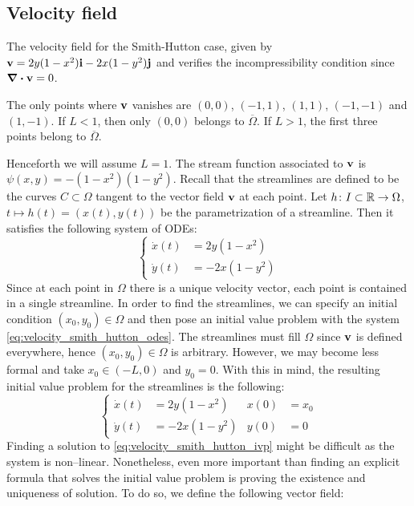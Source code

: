 
\subsection{Velocity field}

The velocity field for the Smith-Hutton case, given by $\vb{v} = 2 y (1 - x^2) \vb{i} - 2 x (1 - y^2) \vb{j}$ and verifies the incompressibility condition since $\div{\vb{v}} = 0$. 

The only points where $\vb{v}$ vanishes are $(0,0)$, $(-1,1)$, $(1,1)$, $(-1,-1)$ and $(1,-1)$. If $L < 1$, then only $(0,0)$ belongs to $\overline{\Omega}$. If $L > 1$, the first three points belong to $\overline{\Omega}$. 

Henceforth we will assume $L = 1$. The stream function associated to $\vb{v}$ is $\psi(x,y) = -(1-x^2)(1-y^2)$. Recall that the streamlines are defined to be the curves $C \subset \Omega$ tangent to the vector field $\vb{v}$ at each point. Let $h \colon I \subset \mathbb{R} \to \Omega$, $t \mapsto h(t) = (x(t), y(t))$ be the parametrization of a streamline. Then it satisfies the following system of ODEs:
\begin{equation} \label{eq:velocity_smith_hutton_odes}
	\left\{
	\begin{aligned}
		\dot{x}(t) &= 2 y (1 - x^2) \\
		\dot{y}(t) &= - 2 x (1 - y^2)
	\end{aligned}
	\right.
\end{equation}
Since at each point in $\Omega$ there is a unique velocity vector, each point is contained in a single streamline. In order to find the streamlines, we can specify an initial condition $(x_0, y_0) \in \Omega$ and then pose an initial value problem with the system \eqref{eq:velocity_smith_hutton_odes}. The streamlines must fill $\Omega$ since $\vb{v}$ is defined everywhere, hence $(x_0, y_0) \in \Omega$ is arbitrary. However, we may become less formal and take $x_0 \in (-L, 0)$ and $y_0 = 0$. With this in mind, the resulting initial value problem for the streamlines is the following:
\begin{equation} \label{eq:velocity_smith_hutton_ivp}
	\left\{
	\begin{aligned}
		\dot{x}(t) &= 2 y (1 - x^2) 	&	x(0) &= x_0 \\
		\dot{y}(t) &= - 2 x (1 - y^2)	&	y(0) &= 0
	\end{aligned}
	\right.
\end{equation}
Finding a solution to \eqref{eq:velocity_smith_hutton_ivp} might be difficult as the system is non--linear. Nonetheless, even more important than finding an explicit formula that solves the initial value problem is proving the existence and uniqueness of solution. To do so, we define the following vector field:
